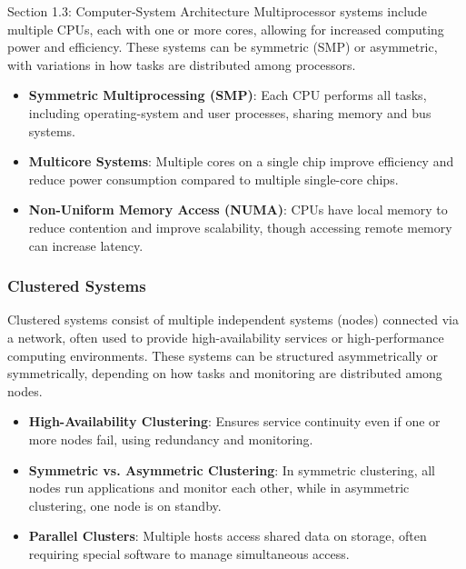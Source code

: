 \begin{notes}{Section 1.3: Computer-System Architecture}
    Multiprocessor systems include multiple CPUs, each with one or more cores, allowing for increased computing power and efficiency. These systems can be symmetric (SMP) or asymmetric, with variations 
    in how tasks are distributed among processors.
    
    \begin{highlight}
    
    \begin{itemize}
        \item \textbf{Symmetric Multiprocessing (SMP)}: Each CPU performs all tasks, including operating-system and user processes, sharing memory and bus systems.
        \item \textbf{Multicore Systems}: Multiple cores on a single chip improve efficiency and reduce power consumption compared to multiple single-core chips.
        \item \textbf{Non-Uniform Memory Access (NUMA)}: CPUs have local memory to reduce contention and improve scalability, though accessing remote memory can increase latency.
    \end{itemize}
    
    \end{highlight}
    
    \subsubsection*{Clustered Systems}
    
    Clustered systems consist of multiple independent systems (nodes) connected via a network, often used to provide high-availability services or high-performance computing environments. These systems 
    can be structured asymmetrically or symmetrically, depending on how tasks and monitoring are distributed among nodes.
    
    \begin{highlight}
    
    \begin{itemize}
        \item \textbf{High-Availability Clustering}: Ensures service continuity even if one or more nodes fail, using redundancy and monitoring.
        \item \textbf{Symmetric vs. Asymmetric Clustering}: In symmetric clustering, all nodes run applications and monitor each other, while in asymmetric clustering, one node is on standby.
        \item \textbf{Parallel Clusters}: Multiple hosts access shared data on storage, often requiring special software to manage simultaneous access.
    \end{itemize}
    

\end{highlight}
\end{notes}
